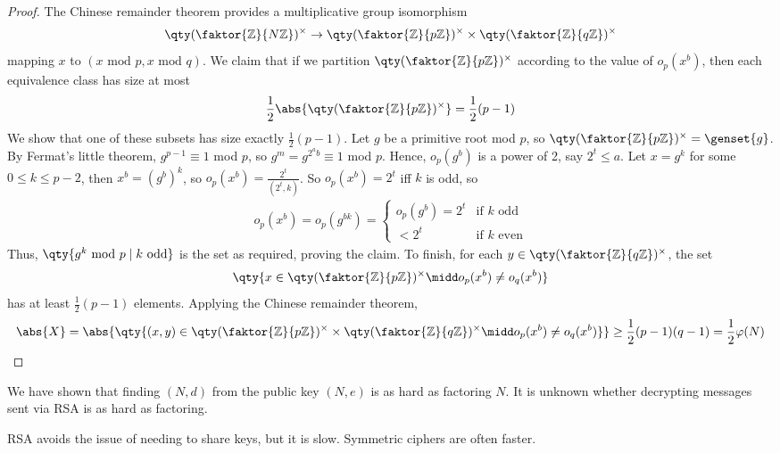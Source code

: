 \begin{proof}
    The Chinese remainder theorem provides a multiplicative group isomorphism
    \begin{align*}
        \qty(\faktor{\mathbb Z}{N\mathbb Z})^\times \to \qty(\faktor{\mathbb Z}{p\mathbb Z})^\times \times \qty(\faktor{\mathbb Z}{q\mathbb Z})^\times
    \end{align*}
    mapping $x$ to $(x \text{ mod } p, x \text{ mod } q)$.
    We claim that if we partition $\qty(\faktor{\mathbb Z}{p\mathbb Z})^\times$ according to the value of $o_p(x^b)$, then each equivalence class has size at most
    \begin{align*}
        \frac{1}{2} \abs{\qty(\faktor{\mathbb Z}{p\mathbb Z})^\times} = \frac{1}{2}(p-1)
    \end{align*}
    We show that one of these subsets has size exactly $\frac{1}{2}(p-1)$.
    Let $g$ be a primitive root mod $p$, so $\qty(\faktor{\mathbb Z}{p\mathbb Z})^\times = \genset{g}$.
    By Fermat's little theorem, $g^{p-1} \equiv 1$ mod $p$, so $g^m = g^{2^a b} \equiv 1$ mod $p$.
    Hence, $o_p(g^b)$ is a power of 2, say $2^t \leq a$.
    Let $x = g^k$ for some $0 \leq k \leq p - 2$, then $x^b = (g^b)^k$, so $o_p(x^b) = \frac{2^t}{(2^t, k)}$.
    So $o_p(x^b) = 2^t$ iff $k$ is odd, so
    \begin{align*}
        o_p(x^b) = o_p(g^{bk}) =
        \begin{cases}
            o_p(g^b) = 2^t & \text{if } k \text{ odd} \\
            < 2^t & \text{if } k \text{ even}
        \end{cases}
    \end{align*}
    Thus, $\qty{g^k \text{ mod } p \mid k \text{ odd}}$ is the set as required, proving the claim.
    To finish, for each $y \in \qty(\faktor{\mathbb Z}{q\mathbb Z})^\times$, the set
    \begin{align*}
        \qty{x \in \qty(\faktor{\mathbb Z}{p\mathbb Z})^\times \midd o_p(x^b) \neq o_q(x^b)}
    \end{align*}
    has at least $\frac{1}{2}(p-1)$ elements.
    Applying the Chinese remainder theorem,
    \begin{align*}
        \abs{X} = \abs{\qty{(x,y) \in \qty(\faktor{\mathbb Z}{p\mathbb Z})^\times \times \qty(\faktor{\mathbb Z}{q\mathbb Z})^\times \midd o_p(x^b) \neq o_q(x^b)}} \geq \frac{1}{2}(p-1)(q-1) = \frac{1}{2}\varphi(N)
    \end{align*}
\end{proof}
\begin{remark}
    We have shown that finding $(N, d)$ from the public key $(N, e)$ is as hard as factoring $N$.
    It is unknown whether decrypting messages sent via RSA is as hard as factoring.

    RSA avoids the issue of needing to share keys, but it is slow.
    Symmetric ciphers are often faster.
\end{remark}
